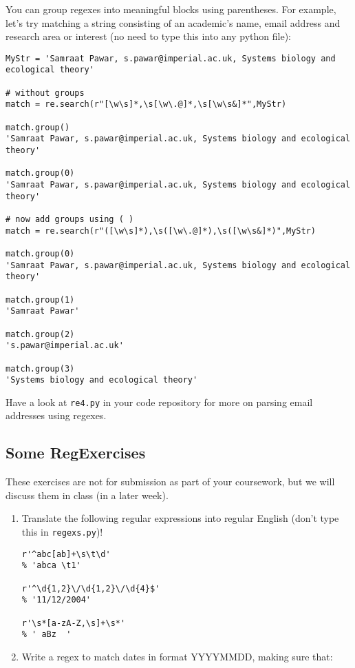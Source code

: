 You can group regexes into meaningful blocks using parentheses. For 
example, let's try matching a string consisting of an academic's name, 
email address and research area or interest (no need to type this into 
any python file): 
  
\begin{lstlisting}
MyStr = 'Samraat Pawar, s.pawar@imperial.ac.uk, Systems biology and 
ecological theory'

# without groups
match = re.search(r"[\w\s]*,\s[\w\.@]*,\s[\w\s&]*",MyStr)

match.group()
'Samraat Pawar, s.pawar@imperial.ac.uk, Systems biology and ecological theory'

match.group(0)
'Samraat Pawar, s.pawar@imperial.ac.uk, Systems biology and ecological theory'

# now add groups using ( )
match = re.search(r"([\w\s]*),\s([\w\.@]*),\s([\w\s&]*)",MyStr)

match.group(0)
'Samraat Pawar, s.pawar@imperial.ac.uk, Systems biology and ecological theory'

match.group(1)
'Samraat Pawar'

match.group(2)
's.pawar@imperial.ac.uk'

match.group(3)
'Systems biology and ecological theory'
\end{lstlisting}

Have a look at {\tt re4.py} in your code repository for more on parsing 
email addresses using regexes.  

\subsection{Some RegExercises}

These exercises are not for submission as part of your coursework, but 
we will discuss them in class (in a later week).

\begin{enumerate}\itemsep16pt

	 \item Translate the following regular expressions into regular 
	 English (don't type this in {\tt regexs.py})!
  
\begin{lstlisting}
r'^abc[ab]+\s\t\d'
% 'abca \t1'

r'^\d{1,2}\/\d{1,2}\/\d{4}$'
% '11/12/2004'

r'\s*[a-zA-Z,\s]+\s*'
% ' aBz  '
\end{lstlisting}
  
\item Write a regex to match dates in format YYYYMMDD, making sure that:
  
  \end{enumerate}
  
